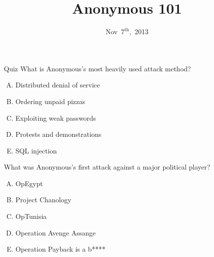 \documentclass{beamer}
\title{Anonymous 101}
\date{Nov~$7^{\text{th}}$,~2013}
\begin{document}
\begin{frame}
\titlepage
\end{frame}

\begin{frame}{Quiz}
%
%
What is Anonymous's most heavily used attack method?
\begin{enumerate}[(A)]
\item<1-2> Distributed denial of service %
\item<1> Ordering unpaid pizzas
\item<1> Exploiting weak passwords
\item<1> Protests and demonstrations
\item<1> SQL injection
\end{enumerate}
What was Anonymous's first attack against a major political player?
\begin{enumerate}[(A)]
\item<1> OpEgypt %
\item<1> Project Chanology %
\item<1> OpTunisia %
\item<1> Operation Avenge Assange %
\item<1-2> Operation Payback is a b**** %
\end{enumerate}
\end{frame}
\end{document}
